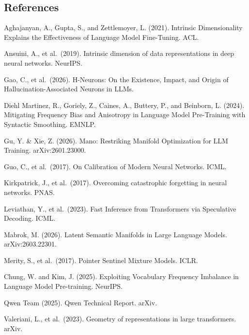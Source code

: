 \documentclass[
  11pt,
]{article}
\begin{document}
\hypertarget{references}{%
\subsection{References}\label{references}}

Aghajanyan, A., Gupta, S., and Zettlemoyer, L. (2021). Intrinsic
Dimensionality Explains the Effectiveness of Language Model Fine-Tuning.
ACL.

Ansuini, A., et al.~(2019). Intrinsic dimension of data representations
in deep neural networks. NeurIPS.

Gao, C., et al.~(2026). H-Neurons: On the Existence, Impact, and Origin
of Hallucination-Associated Neurons in LLMs.

Diehl Martinez, R., Goriely, Z., Caines, A., Buttery, P., and Beinborn,
L. (2024). Mitigating Frequency Bias and Anisotropy in Language Model
Pre-Training with Syntactic Smoothing. EMNLP.

Gu, Y. \& Xie, Z. (2026). Mano: Restriking Manifold Optimization for LLM
Training. arXiv:2601.23000.

Guo, C., et al.~(2017). On Calibration of Modern Neural Networks. ICML.

Kirkpatrick, J., et al.~(2017). Overcoming catastrophic forgetting in
neural networks. PNAS.

Leviathan, Y., et al.~(2023). Fast Inference from Transformers via
Speculative Decoding. ICML.

Mabrok, M. (2026). Latent Semantic Manifolds in Large Language Models.
arXiv:2603.22301.

Merity, S., et al.~(2017). Pointer Sentinel Mixture Models. ICLR.

Chung, W. and Kim, J. (2025). Exploiting Vocabulary Frequency Imbalance
in Language Model Pre-training. NeurIPS.

Qwen Team (2025). Qwen Technical Report. arXiv.

Valeriani, L., et al.~(2023). Geometry of representations in large
transformers. arXiv.
\end{document}
